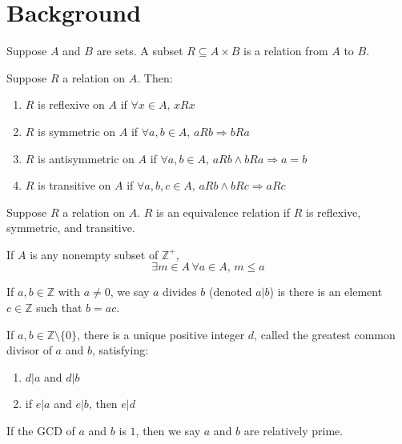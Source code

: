 \documentclass{article}
\begin{document}
\section{Background}
\begin{defi}[Relation]
	Suppose \(A\) and \(B\) are sets. A subset \(R\subseteq A\times B\) is a relation from \(A\) to \(B\).
\end{defi}
\begin{defi}
	Suppose \(R\) a relation on \(A\). Then:
	\begin{enumerate}
		\item \(R\) is reflexive on \(A\) if \(\forall x\in A,\,xRx\)
		\item \(R\) is symmetric on \(A\) if \(\forall a,b\in A,\,aRb\Rightarrow bRa\)
		\item \(R\) is antisymmetric on \(A\) if \(\forall a,b\in A,\,aRb\wedge bRa\Rightarrow a=b\)
		\item \(R\) is transitive on \(A\) if \(\forall a,b,c\in A,\,aRb\wedge bRc\Rightarrow aRc\)
	\end{enumerate}
\end{defi}
\begin{defi}
	Suppose \(R\) a relation on \(A\). \(R\) is an equivalence relation if \(R\) is reflexive, symmetric, and transitive.
\end{defi}
\begin{defi}
	If \(A\) is any nonempty subset of \(\mathbb{Z^+}\),
	\begin{equation*}
		\exists m\in A\,\forall a\in A,\,m\leq a
	\end{equation*}
\end{defi}
\begin{defi}[Divisibility]
	If \(a,b\in\mathbb{Z}\) with \(a\neq 0\), we say \(a\) divides \(b\) (denoted \(a|b\)) is there is an element \(c\in\mathbb{Z}\) such that \(b=ac\).
\end{defi}
\begin{defi}[GCD]
	If \(a,b\in\mathbb{Z}\setminus\{0\}\), there is a unique positive integer \(d\), called the greatest common divisor of \(a\) and \(b\), satisfying:
	\begin{enumerate}
		\item \(d|a\) and \(d|b\)
		\item if \(e|a\) and \(e|b\), then \(e|d\)
	\end{enumerate}
	If the GCD of \(a\) and \(b\) is \(1\), then we say \(a\) and \(b\) are relatively prime.
\end{defi}
\end{document}
